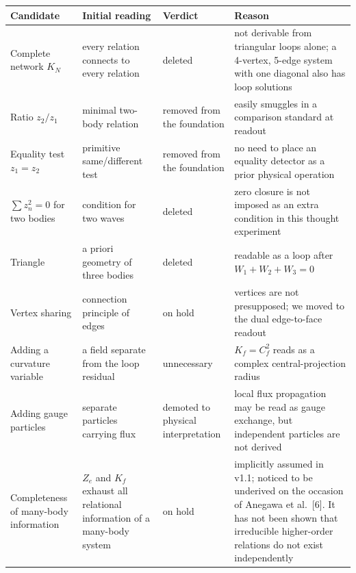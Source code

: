 \documentclass[
  a4paper,
]{article}
\newcounter{none} %
\begin{document}
{\def\LTcaptype{none} %
\begin{longtable}[]{@{}
  >{\raggedright\arraybackslash}p{}
  >{\raggedright\arraybackslash}p{}
  >{\raggedright\arraybackslash}p{}
  >{\raggedright\arraybackslash}p{}@{}}
\toprule\noalign{}
\begin{minipage}[b]{\linewidth}\raggedright
Candidate
\end{minipage} & \begin{minipage}[b]{\linewidth}\raggedright
Initial reading
\end{minipage} & \begin{minipage}[b]{\linewidth}\raggedright
Verdict
\end{minipage} & \begin{minipage}[b]{\linewidth}\raggedright
Reason
\end{minipage} \\
\midrule\noalign{}
\endhead
\bottomrule\noalign{}
\endlastfoot
Complete network \(K_N\) & every relation connects to every relation &
deleted & not derivable from triangular loops alone; a 4-vertex, 5-edge
system with one diagonal also has loop solutions \\
Ratio \(z_2/z_1\) & minimal two-body relation & removed from the
foundation & easily smuggles in a comparison standard at readout \\
Equality test \(z_1=z_2\) & primitive same/different test & removed from
the foundation & no need to place an equality detector as a prior
physical operation \\
\(\sum z_n^2=0\) for two bodies & condition for two waves & deleted &
zero closure is not imposed as an extra condition in this thought
experiment \\
Triangle & a priori geometry of three bodies & deleted & readable as a
loop after \(W_1+W_2+W_3=0\) \\
Vertex sharing & connection principle of edges & on hold & vertices are
not presupposed; we moved to the dual edge-to-face readout \\
Adding a curvature variable & a field separate from the loop residual &
unnecessary & \(K_f=C_f^2\) reads as a complex central-projection
radius \\
Adding gauge particles & separate particles carrying flux & demoted to
physical interpretation & local flux propagation may be read as gauge
exchange, but independent particles are not derived \\
Completeness of many-body information & \(Z_e\) and \(K_f\) exhaust all
relational information of a many-body system & on hold & implicitly
assumed in v1.1; noticed to be underived on the occasion of Anegawa et
al.~{[}6{]}. It has not been shown that irreducible higher-order
relations do not exist independently \\
\end{longtable}
}
\end{document}
